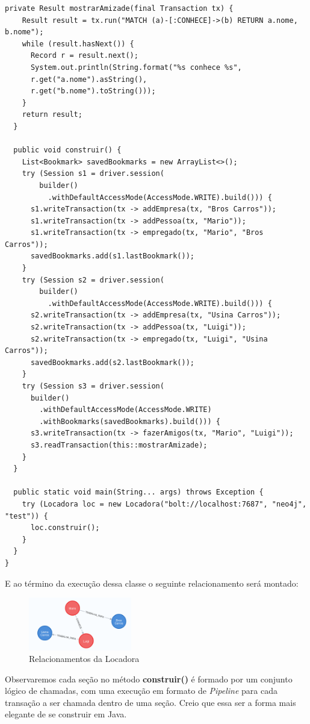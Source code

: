 \begin{lstlisting}[]
  private Result mostrarAmizade(final Transaction tx) {
    Result result = tx.run("MATCH (a)-[:CONHECE]->(b) RETURN a.nome, b.nome");
    while (result.hasNext()) {
      Record r = result.next();
      System.out.println(String.format("%s conhece %s",
      r.get("a.nome").asString(),
      r.get("b.nome").toString()));
    }
    return result;
  }

  public void construir() {
    List<Bookmark> savedBookmarks = new ArrayList<>();
    try (Session s1 = driver.session(
        builder()
          .withDefaultAccessMode(AccessMode.WRITE).build())) {
      s1.writeTransaction(tx -> addEmpresa(tx, "Bros Carros"));
      s1.writeTransaction(tx -> addPessoa(tx, "Mario"));
      s1.writeTransaction(tx -> empregado(tx, "Mario", "Bros Carros"));
      savedBookmarks.add(s1.lastBookmark());
    }
    try (Session s2 = driver.session(
        builder()
          .withDefaultAccessMode(AccessMode.WRITE).build())) {
      s2.writeTransaction(tx -> addEmpresa(tx, "Usina Carros"));
      s2.writeTransaction(tx -> addPessoa(tx, "Luigi"));
      s2.writeTransaction(tx -> empregado(tx, "Luigi", "Usina Carros"));
      savedBookmarks.add(s2.lastBookmark());
    }
    try (Session s3 = driver.session(
      builder()
        .withDefaultAccessMode(AccessMode.WRITE)
        .withBookmarks(savedBookmarks).build())) {
      s3.writeTransaction(tx -> fazerAmigos(tx, "Mario", "Luigi"));
      s3.readTransaction(this::mostrarAmizade);
    }
  }

  public static void main(String... args) throws Exception {
    try (Locadora loc = new Locadora("bolt://localhost:7687", "neo4j", "test")) {
      loc.construir();
    }
  }
}
\end{lstlisting}

E ao término da execução dessa classe o seguinte relacionamento será montado:
\begin{figure}[H]
	\centering
	\includegraphics[width=0.4\textwidth]{imagens/locadora}
	\caption{Relacionamentos da Locadora}
\end{figure}

Observaremos cada seção no método \textbf{construir()} é formado por um conjunto lógico de chamadas, com uma execução em formato de \textit{Pipeline} para cada transação a ser chamada dentro de uma seção. Creio que essa ser a forma mais elegante de se construir em Java.